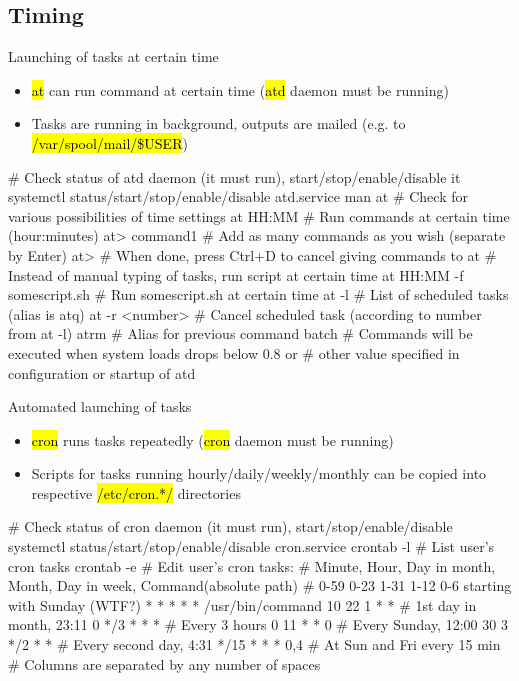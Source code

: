 \documentclass[compress, ucs, xelatex, 11pt, xcolor=svgnames,
  hyperref={
    bookmarks=true,
    unicode=true,
    colorlinks=true,
    pdftitle={Linux, command line and MetaCentrum},
    plainpages=false,
    pdfauthor={Vojtech Zeisek},
    pdfsubject={Course about use of Linux command line, writing shell scripts and using MetaCentrum of CESNET},
    pdfcreator={XeLaTeX},
    pdfkeywords={Linux, GNU, BASH, shell, command line, MetaCentrum},
    linkcolor=DarkRed,
    anchorcolor=DarkBlue,
    citecolor=Indigo,
    filecolor=NavyBlue,
    menucolor=DarkMagenta,
    urlcolor=DarkBlue,
    pdftex},
  url={hyphens, lowtilde} %
  ]{beamer}
\renewcommand{\texttt}[1]{\hl{\ttfamily #1}}
\begin{document}
\subsection{Timing}

\begin{frame}[fragile]{Launching of tasks at certain time}
  \begin{itemize}
    \item \texttt{at} can run command at certain time (\texttt{atd} daemon must be running)
    \item Tasks are running in background, outputs are mailed (e.g. to \texttt{/var/spool/mail/\$USER})
  \end{itemize}
  \begin{bashcode}
    # Check status of atd daemon (it must run), start/stop/enable/disable it
    systemctl status/start/stop/enable/disable atd.service
    man at # Check for various possibilities of time settings
    at HH:MM # Run commands at certain time (hour:minutes)
    at> command1 # Add as many commands as you wish (separate by Enter)
    at> # When done, press Ctrl+D to cancel giving commands to at
    # Instead of manual typing of tasks, run script at certain time
    at HH:MM -f somescript.sh # Run somescript.sh at certain time
    at -l # List of scheduled tasks (alias is atq)
    at -r <number> # Cancel scheduled task (according to number from at -l)
    atrm # Alias for previous command
    batch # Commands will be executed when system loads drops below 0.8 or
          # other value specified in configuration or startup of atd
  \end{bashcode}
\end{frame}

\begin{frame}[fragile]{Automated launching of tasks}
  \begin{itemize}
    \item \texttt{cron} runs tasks repeatedly (\texttt{cron} daemon must be running)
    \item Scripts for tasks running hourly/daily/weekly/monthly can be copied into respective \texttt{/etc/cron.*/} directories
  \end{itemize}
  \begin{bashcode}
    # Check status of cron daemon (it must run), start/stop/enable/disable
    systemctl status/start/stop/enable/disable cron.service
    crontab -l # List user's cron tasks
    crontab -e # Edit user's cron tasks:
    # Minute, Hour, Day in month, Month, Day in week, Command(absolute path)
    # 0-59    0-23  1-31          1-12   0-6 starting with Sunday (WTF?)
      *       *     *             *      *            /usr/bin/command
      10      22    1             *      *    # 1st day in month, 23:11
      0       */3   *             *      *    # Every 3 hours
      0       11    *             *      0    # Every Sunday, 12:00
      30      3     */2           *      *    # Every second day, 4:31
      */15    *     *             *      0,4  # At Sun and Fri every 15 min
    # Columns are separated by any number of spaces
  \end{bashcode}
\end{frame}
\end{document}
